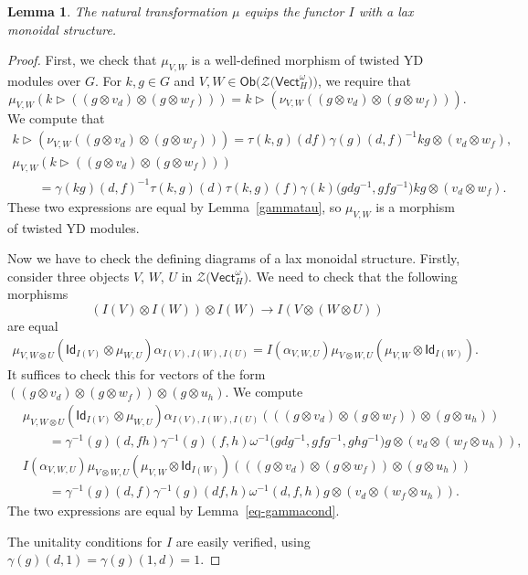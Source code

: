 \documentclass[pdftex]{sigma}
\numberwithin{equation}{section}
\newtheorem{Lemma}[Theorem]{Lemma}
\newcommand{\ide}{\mathsf{Id}}
\newcommand{\Ob}{\mathsf{Ob}}
\newcommand{\Vect}{\mathsf{Vect}}
\newcommand{\cZ}{\mathcal{Z}}
\newcommand{\rI}{I}
\begin{document}
\begin{Lemma}\label{lem:lax}
The natural transformation $\mu$ equips the functor $\rI$ with a lax monoidal structure.
\end{Lemma}
\begin{proof}
First, we check that $\mu_{V,W}$ is a well-defined morphism of twisted YD modules over $G$. For $k,g \in G$ and $V,W \in \Ob \big( \cZ\big(\Vect_H^\omega\big) \big)$, we require that \[\mu_{V,W}(k\vartriangleright ((g \otimes v_d) \otimes (g \otimes w_f))) = k \vartriangleright (\nu_{V,W}((g \otimes v_d) \otimes (g \otimes w_f))).\]
We compute that
\begin{gather*}
 k \vartriangleright (\nu_{V,W}((g \otimes v_d) \otimes (g \otimes w_f))) = \tau(k,g)(df)\gamma(g)(d,f)^{-1}kg \otimes (v_d \otimes w_f),\\
 \mu_{V,W}(k\vartriangleright ((g \otimes v_d) \otimes (g \otimes w_f))) \\
 \qquad{} = \gamma(kg)(d,f)^{-1}\tau(k,g)(d)\tau(k,g)(f) \gamma(k)\big(gdg^{-1},gfg^{-1}\big) kg \otimes (v_d \otimes w_f).
\end{gather*}
These two expressions are equal by Lemma~\ref{gammatau}, so $\mu_{V,W}$ is a morphism of twisted YD modules.

Now we have to check the defining diagrams of a lax monoidal structure. Firstly, consider three objects $V$, $W$, $U$ in $\cZ\big(\Vect_H^\omega\big)$. We need to check that the following morphisms
\[(\rI(V)\otimes \rI(W))\otimes \rI(W)\to \rI(V\otimes (W\otimes U))\] are equal
\begin{align*}
 \mu_{V,W\otimes U}(\ide_{\rI(V)}\otimes \mu_{W,U})\alpha_{\rI(V),\rI(W),\rI(U)}=\rI(\alpha_{V,W,U})\mu_{V\otimes W,U}(\mu_{V,W}\otimes \ide_{\rI(W)}).
\end{align*}
It suffices to check this for vectors of the form $((g\otimes v_d)\otimes (g\otimes w_f))\otimes (g\otimes u_h)$.
We compute
\begin{align*}
 &\mu_{V,W\otimes U}(\ide_{\rI(V)}\otimes \mu_{W,U})\alpha_{\rI(V),\rI(W),\rI(U)}(((g\otimes v_d)\otimes (g\otimes w_f))\otimes (g \otimes u_h))\\
 &\qquad =
\gamma^{-1}(g)(d, fh)\gamma^{-1}(g)(f,h)\omega^{-1}\big(gdg^{-1},gfg^{-1},ghg^{-1}\big)g\otimes (v_d\otimes (w_f\otimes u_h)),
 \\
&\rI(\alpha_{V,W,U})\mu_{V\otimes W,U}(\mu_{V,W}\otimes \ide_{\rI(W)})(((g\otimes v_d)\otimes (g\otimes w_f))\otimes (g \otimes u_h))\\
&\qquad = \gamma^{-1}(g)(d,f)\gamma^{-1}(g)(df,h)\omega^{-1}(d,f,h)g\otimes (v_d\otimes (w_f\otimes u_h)).
\end{align*}
The two expressions are equal by Lemma~\ref{eq-gammacond}.

The unitality conditions for $\rI$ are easily verified, using $\gamma(g)(d,1)=\gamma(g)(1,d)=1$.
\end{proof}
\end{document}
